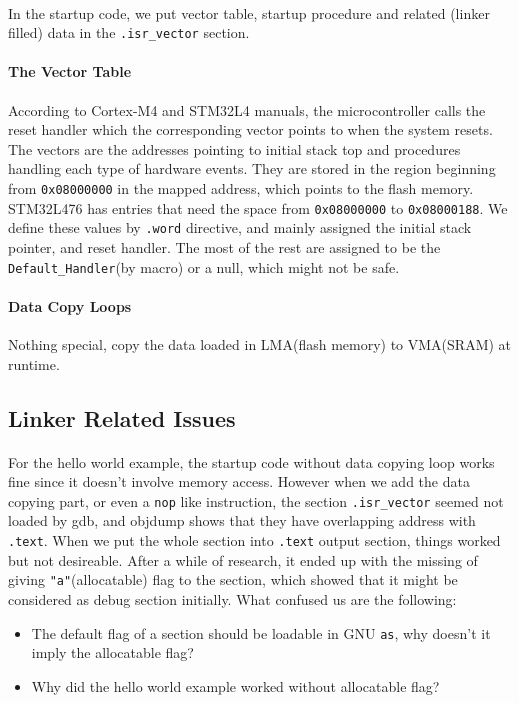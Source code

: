 \paragraph{}
In the startup code, we put vector table, startup procedure and related (linker filled) data in the \texttt{.isr\_vector} section.
\paragraph{The Vector Table}
According to Cortex-M4 and STM32L4 manuals, the microcontroller calls the reset handler which the corresponding vector points to when the system resets.
The vectors are the addresses pointing to initial stack top and procedures handling each type of hardware events.
They are stored in the region beginning from \texttt{0x08000000} in the mapped address,
which points to the flash memory.
STM32L476 has entries that need the space from \texttt{0x08000000} to \texttt{0x08000188}.
We define these values by \texttt{.word} directive, and mainly assigned the initial stack pointer, and reset handler.
The most of the rest are assigned to be the \texttt{Default\_Handler}(by macro) or a null, which might not be safe.
\paragraph{Data Copy Loops}
Nothing special, copy the data loaded in LMA(flash memory) to VMA(SRAM) at runtime.
\subsection{Linker Related Issues}
\paragraph{}
For the hello world example, the startup code without data copying loop works fine since it doesn't involve memory access.
However when we add the data copying part, or even a \texttt{nop} like instruction,
the section \texttt{.isr\_vector} seemed not loaded by gdb, and objdump shows that they have overlapping address with \texttt{.text}.
When we put the whole section into \texttt{.text} output section, things worked but not desireable.
After a while of research, it ended up with the missing of giving \texttt{"a"}(allocatable) flag to the section,
which showed that it might be considered as debug section initially.
What confused us are the following:
\begin{itemize}
\item The default flag of a section should be loadable in GNU \texttt{as}, why doesn't it imply the allocatable flag?
\item Why did the hello world example worked without allocatable flag?
\end{itemize}
